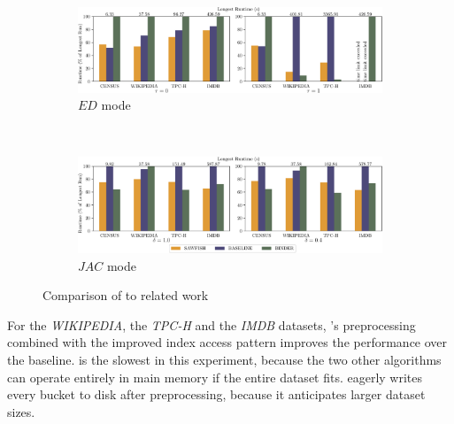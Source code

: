 \begin{figure}[ht]
    \centering
    \begin{subfigure}[b]{\textwidth}
        \centering
        \includegraphics[width=\textwidth]{figures/competitor_ed.pdf}
        \caption{$ED$ mode}
        \label{fig:eval:comparsion_ed}
    \end{subfigure}\\
    \begin{subfigure}[b]{\textwidth}
        \centering
        \includegraphics[width=\textwidth]{figures/competitor_jac.pdf}
        \caption{$JAC$ mode}
        \label{fig:eval:comparison_jac}
    \end{subfigure}
    \caption{Comparison of \sawfish to related work}
\end{figure}

For the \emph{WIKIPEDIA}, the \emph{TPC-H} and the \emph{IMDB} datasets, \sawfish's preprocessing combined with the improved index access pattern improves the performance over the baseline.
 is the slowest in this experiment, because the two other algorithms can operate entirely in main memory if the entire dataset fits.
 eagerly writes every bucket to disk after preprocessing, because it anticipates larger dataset sizes.

